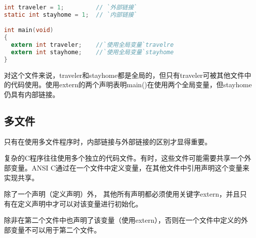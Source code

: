 \begin{frame}[fragile]\ft{\subsecname}
\begin{lstlisting}[language=c,frame=single]
int traveler = 1;         // `外部链接`
static int stayhome = 1;  // `内部链接`

int main(void)
{
  extern int traveler;    //`使用全局变量`travelre
  extern int stayhome;    //`使用全局变量`stayhome
}
\end{lstlisting}   \pause
对这个文件来说，{\tf traveler}和{\tf stayhome}都是全局的，但只有{\tf traveler}可被其他文件中的代码使用。使用extern的两个声明表明{\tf main()}在使用两个全局变量，但{\tf stayhome}仍具有内部链接。
\end{frame}


\subsection{多文件}
\begin{frame}\ft{\subsecname}
  只有在使用多文件程序时，内部链接与外部链接的区别才显得重要。
\end{frame}

\begin{frame}\ft{\subsecname}
  复杂的C程序往往使用多个独立的代码文件。有时，这些文件可能需要共享一个外部变量。ANSI C通过\textcolor{acolor1}{在一个文件中定义变量，在其他文件中引用声明这个变量}来实现共享。

  \textcolor{acolor3}{除了一个声明（定义声明）外， 其他所有声明都必须使用关键字{\tf extern}，并且只有在定义声明中才可以对该变量进行初始化。}
\end{frame}

\begin{frame}\ft{\subsecname}
除非在第二个文件中也声明了该变量（使用{\tf extern}），否则在一个文件中定义的外部变量不可以用于第二个文件。
\end{frame}